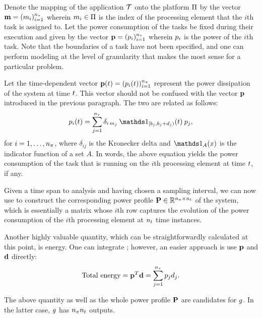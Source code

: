 Denote the mapping of the application $\mathcal{T}$ onto the platform $\Pi$ by the
vector $\mathbf{m} = (m_i)_{i = 1}^{{n_\tau}}$ wherein $m_i \in \Pi$ is the index of
the processing element that the $i$th task is assigned to. Let the power
consumption of the tasks be fixed during their execution and given by the vector
$\mathbf{p} = (p_i)_{i = 1}^{{n_\tau}}$ wherein $p_i$ is the power of the $i$th task. Note
that the boundaries of a task have not been specified, and one can perform
modeling at the level of granularity that makes the most sense for a particular
problem.

Let the time-dependent vector $\mathbf{p}(t) = (p_i(t))_{i = 1}^{{n_\pi}}$ represent the
power dissipation of the system at time $t$. This vector should not be confused
with the vector $\mathbf{p}$ introduced in the previous paragraph. The two are related
as follows:
\begin{equation} \elab{power}
  \p_i(\t) = \sum_{j = 1}^{\nt} \delta_{i\,m_j} \: \one_{[\b_j, \b_j +
    \d_j)}(\t) \: \p_j,
\end{equation}
for $i = 1, \dots, {n_\pi}$, where $\delta_{ij}$ is the Kronecker delta and
$\one_A(x)$ is the indicator function of a set $A$. In words, the above equation
yields the power consumption of the task that is running on the $i$th processing
element at time $t$, if any.

Given a time span to analysis and having chosen a sampling interval, we can now
use  to construct the corresponding power profile $\mathbf{P} \in
\mathbb{R}^{{n_\pi} \times {n_t}}$ of the system, which is essentially a matrix whose $i$th
row captures the evolution of the power consumption of the $i$th processing
element at ${n_t}$ time instances.

Another highly valuable quantity, which can be straightforwardly calculated at
this point, is energy. One can integrate ; however, an easier
approach is use $\mathbf{p}$ and $\mathbf{d}$ directly:
\begin{equation} \elab{total-energy}
  \text{Total energy} = \vp^T \vd = \sum_{j = 1}^\nt \p_j \d_j.
\end{equation}

The above quantity as well as the whole power profile $\mathbf{P}$ are candidates for
$g$. In the latter case, $g$ has ${n_\pi} {n_t}$ outputs.

